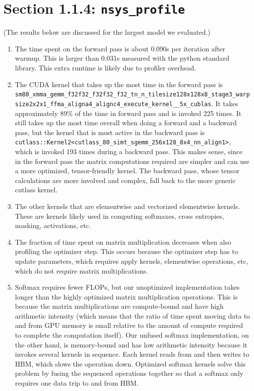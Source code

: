 \documentclass[11pt, letterpaper]{article}
\begin{document}
\section*{Section 1.1.4: \texttt{nsys\_profile}}
(The results below are discussed for the largest model we evaluated.)
\begin{enumerate}[label=(\alph*)]
    \item The time spent on the forward pass is about 0.090s per iteration after warmup. This is larger than 0.031s measured with the python standard library. This extra runtime is likely due to profiler overhead.
    \item The CUDA kernel that takes up the most time in the forward pass is \texttt{sm80\_xmma\_gemm\_f32f32\_f32f32\_f32\_tn\_n\_tilesize128x128x8\_stage3\_warpsize2x2x1\_ffma\_aligna4\_alignc4\_execute\_kernel\_\_5x\_cublas}. It takes approximately 89\% of the time in forward pass and is invoked 225 times. It still takes up the most time overall when doing a forward and a backward pass, but the kernel that is most active in the backward pass is \texttt{cutlass::Kernel2<cutlass\_80\_simt\_sgemm\_256x128\_8x4\_nn\_align1>}, which is invoked 193 times during a backward pass. This makes sense, since in the forward pass the matrix computations required are simpler and can use a more optimized, tensor-friendly kernel. The backward pass, whose tensor calculations are more involved and complex, fall back to the more generic cutlass kernel.
    \item The other kernels that are elementwise and vectorized elementwise kernels. These are kernels likely used in computing softmaxes, cross entropies, masking, activations, etc.
    \item The fraction of time spent on matrix multiplication decreases when also profiling the optimizer step. This occurs because the optimizer step has to update parameters, which requires apply kernels, elementwise operations, etc, which do not require matrix multiplications.
    \item Softmax requires fewer FLOPs, but our unoptimized implementation takes longer than the highly optimized matrix multiplication operations. This is because the matrix multiplications are compute-bound and have high arithmetic intensity (which means that the ratio of time spent moving data to and from GPU memory is small relative to the amount of compute required to complete the computation itself). Our unfused softmax implementation, on the other hand, is memory-bound and has low arithmetic intensity because it invokes several kernels in sequence. Each kernel reads from and then writes to HBM, which slows the operation down. Optimized softmax kernels solve this problem by fusing the sequenced operations together so that a softmax only requires one data trip to and from HBM.
\end{enumerate}
\end{document}
